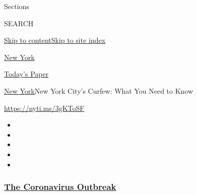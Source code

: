 Sections

SEARCH

\protect\hyperlink{site-content}{Skip to
content}\protect\hyperlink{site-index}{Skip to site index}

\href{https://www.nytimes3xbfgragh.onion/section/nyregion}{New York}

\href{https://myaccount.nytimes3xbfgragh.onion/auth/login?response_type=cookie\&client_id=vi}{}

\href{https://www.nytimes3xbfgragh.onion/section/todayspaper}{Today's
Paper}

\href{/section/nyregion}{New York}\textbar{}New York City's Curfew: What
You Need to Know

\url{https://nyti.ms/3gKToSF}

\begin{itemize}
\item
\item
\item
\item
\item
\end{itemize}

\hypertarget{the-coronavirus-outbreak}{%
\subsubsection{\texorpdfstring{\href{https://www.nytimes3xbfgragh.onion/news-event/coronavirus?name=styln-coronavirus-national\&region=TOP_BANNER\&block=storyline_menu_recirc\&action=click\&pgtype=Article\&impression_id=d7f3aee0-f4b9-11ea-9a28-53af4ab06a19\&variant=undefined}{The
Coronavirus
Outbreak}}{The Coronavirus Outbreak}}\label{the-coronavirus-outbreak}}

